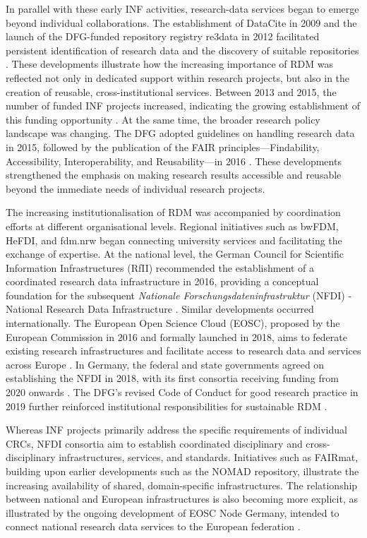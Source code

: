 \documentclass{eceasst}
\begin{document}
In parallel with these early INF activities,
research-data services began to emerge beyond
individual collaborations. The establishment of
DataCite in 2009 and the launch of the DFG-funded
repository registry re3data in 2012 facilitated
persistent identification of research data and the
discovery of suitable repositories
\cite{DataCiteHistory,re3data2023}.
These developments illustrate how the increasing
importance of RDM was reflected
not only in dedicated support within research projects,
but also in the creation of reusable, cross-institutional
services.
Between 2013 and 2015, the number of funded INF projects
increased, indicating the growing establishment of this
funding opportunity
\cite{Engelhardt2013Forschungsdatenmanagement,bastian_2025}.
At the same time, the broader research policy landscape
was changing. The DFG adopted guidelines on handling
research data in 2015, followed by the publication of
the FAIR principles---Findability, Accessibility,
Interoperability, and Reusability---in 2016
\cite{DFG2015RDM,WilkinsonDumontier2016}.
These developments strengthened the emphasis on making
research results accessible and reusable beyond the
immediate needs of individual research projects.

The increasing institutionalisation of RDM
was accompanied by coordination efforts at
different organisational levels. Regional initiatives
such as bwFDM, HeFDI, and fdm.nrw began connecting
university services and facilitating the exchange of
expertise. At the national level, the German Council
for Scientific Information Infrastructures (RfII)
recommended the establishment of a coordinated
research data infrastructure in 2016, providing a
conceptual foundation for the subsequent \emph{Nationale Forschungsdateninfrastruktur} (NFDI) - National
Research Data Infrastructure \cite{RfII2016}.
Similar developments occurred internationally.
The European Open Science Cloud (EOSC), proposed by
the European Commission in 2016 and formally launched
in 2018, aims to federate existing research
infrastructures and facilitate access to research
data and services across Europe \cite{EOSC2018}.
In Germany, the federal and state governments agreed
on establishing the NFDI in 2018, with its first
consortia receiving funding from 2020 onwards
\cite{NFDI2020}.
The DFG's revised Code of Conduct for good research
practice in 2019 further reinforced institutional
responsibilities for sustainable RDM \cite{DFG2019Code}.

Whereas INF projects primarily address the specific
requirements of individual CRCs, NFDI consortia aim
to establish coordinated disciplinary and
cross-disciplinary infrastructures, services,
and standards. Initiatives such as FAIRmat, building
upon earlier developments such as the NOMAD
repository, illustrate the increasing availability
of shared, domain-specific infrastructures.
The relationship between national and European
infrastructures is also becoming more explicit,
as illustrated by the ongoing development of
EOSC Node Germany, intended to connect national
research data services to the European federation
\cite{EOSCNodeGermany}.
\end{document}
